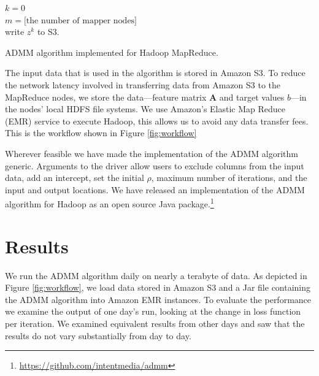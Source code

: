 \documentclass[10pt, conference, compsocconf]{IEEEtran}
\begin{document}
\begin{algorithm}
\SetAlgoLined
{}
$k=0$\\
$m=\text{[the number of mapper nodes]}$\\
write $z^k$ to S3.
\label{alg:admm}
\vspace{1em}
\caption{ADMM algorithm implemented for Hadoop MapReduce.}
\end{algorithm}

The input data that is used in the algorithm is stored in Amazon S3.  To reduce the network latency involved in transferring data from Amazon S3 to the MapReduce nodes, we store the data---feature matrix $\mathbf{A}$ and target values $b$---in the nodes' local HDFS file systems.  We use Amazon's Elastic Map Reduce (EMR) service to execute Hadoop, this allows us to avoid any data transfer fees.  This is the workflow shown in Figure \ref{fig:workflow}

Wherever feasible we have made the implementation of the ADMM algorithm generic.  Arguments to the driver allow users to exclude columns from the input data, add an intercept, set the initial $\rho$, maximum number of iterations, and the input and output locations. We have released an implementation of the ADMM algorithm for Hadoop as an open source Java package.\footnote{\url{https://github.com/intentmedia/admm}}

\section{Results}\label{sec:results}
We run the ADMM algorithm daily on nearly a terabyte of data.  As depicted in Figure \ref{fig:workflow}, we load data stored in Amazon S3 and a Jar file containing the ADMM algorithm into Amazon EMR instances.  To evaluate the performance we examine the output of one day's run, looking at the change in loss function per iteration.  We examined equivalent results from other days and saw that the results do not vary substantially from day to day.
\end{document}

